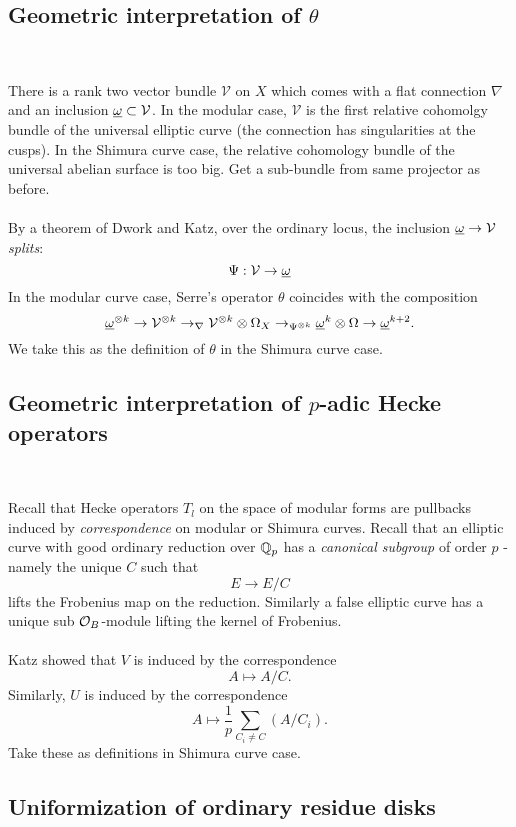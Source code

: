 \documentclass[12pt,amsfont]{amsart}
\begin{document}
\subsection{Geometric interpretation of $\theta$}
{\ }

There is a rank two vector bundle $\mathcal{V}$ on $X$ which comes with a flat connection $\nabla$ and an inclusion $\underline{\omega} \subset \mathcal{V}$. In the modular case, $\mathcal{V}$ is the first relative cohomolgy bundle of the universal elliptic curve (the connection has singularities at the cusps). In the Shimura curve case, the relative cohomology bundle of the universal abelian surface is too big. Get a sub-bundle from same projector as before. \\ \\
By a theorem of Dwork and Katz, over the ordinary locus, the inclusion $\underline{\omega} \rightarrow \mathcal{V}$ \emph{splits}:
\[\Psi: \mathcal{V} \rightarrow \underline{\omega}\]
In the modular curve case, Serre's operator $\theta$ coincides with the composition
\[\underline{\omega}^{\otimes k} \rightarrow \mathcal{V}^{\otimes k} \rightarrow_\nabla \mathcal{V}^{\otimes k} \otimes \Omega_X \rightarrow_{\Psi^{\otimes k}} \underline{\omega}^k \otimes \Omega \rightarrow \underline{\omega}^{k+2}.\]
We take this as the definition of $\theta$ in the Shimura curve case.

\subsection{Geometric interpretation of $p$-adic Hecke operators}
{\ }

Recall that Hecke operators $T_l$ on the space of modular forms are pullbacks induced by \emph{correspondence} on modular or Shimura curves. Recall that an elliptic curve with good ordinary reduction over ${\mathbb Q}_p$ has a \emph{canonical subgroup} of order $p$ - namely the unique $C$ such that
\[E \rightarrow E/C \]
lifts the Frobenius map on the reduction. Similarly a false elliptic curve has a unique sub $\mathcal{O}_B$-module lifting the kernel of Frobenius. \\ \\
Katz showed that $V$ is induced by the correspondence
\[A \mapsto A/C.\]
Similarly, $U$ is induced by the correspondence 
\[A \mapsto \frac{1}{p} \sum_{C_i \ne C} (A/C_i).\]
Take these as definitions in Shimura curve case. 

\subsection{Uniformization of ordinary residue disks}
{\ }
\end{document}
